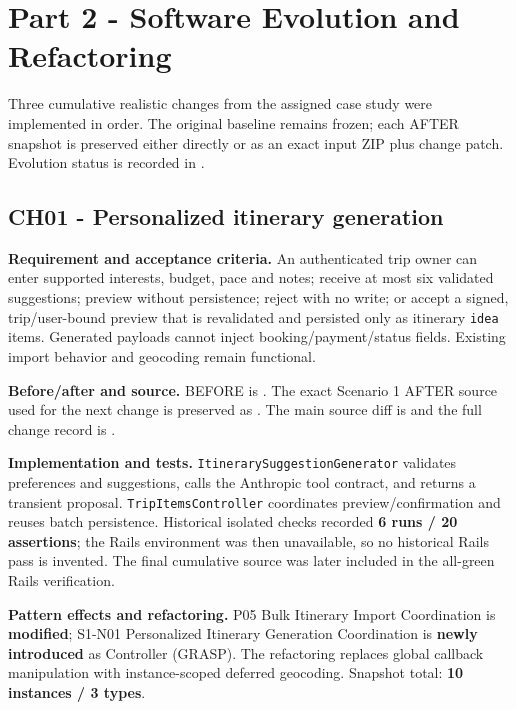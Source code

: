 \documentclass[11pt,a4paper]{article}
\renewcommand{\_}{\textunderscore\allowbreak}
\begin{document}
\section{Part 2 - Software Evolution and Refactoring}
Three cumulative realistic changes from the assigned case study were implemented in order. The original baseline remains frozen; each AFTER snapshot is preserved either directly or as an exact input ZIP plus change patch. Evolution status is recorded in .

\subsection{CH01 - Personalized itinerary generation}
\textbf{Requirement and acceptance criteria.} An authenticated trip owner can enter supported interests, budget, pace and notes; receive at most six validated suggestions; preview without persistence; reject with no write; or accept a signed, trip/user-bound preview that is revalidated and persisted only as itinerary \texttt{idea} items. Generated payloads cannot inject booking/payment/status fields. Existing import behavior and geocoding remain functional.

\textbf{Before/after and source.} BEFORE is . The exact Scenario 1 AFTER source used for the next change is preserved as . The main source diff is  and the full change record is .

\textbf{Implementation and tests.} \texttt{ItinerarySuggestionGenerator} validates preferences and suggestions, calls the Anthropic tool contract, and returns a transient proposal. \texttt{TripItemsController} coordinates preview/confirmation and reuses batch persistence. Historical isolated checks recorded \textbf{6 runs / 20 assertions}; the Rails environment was then unavailable, so no historical Rails pass is invented. The final cumulative source was later included in the all-green Rails verification.

\textbf{Pattern effects and refactoring.} P05 Bulk Itinerary Import Coordination is \textbf{modified}; S1-N01 Personalized Itinerary Generation Coordination is \textbf{newly introduced} as Controller (GRASP). The refactoring replaces global callback manipulation with instance-scoped deferred geocoding. Snapshot total: \textbf{10 instances / 3 types}.
\end{document}
